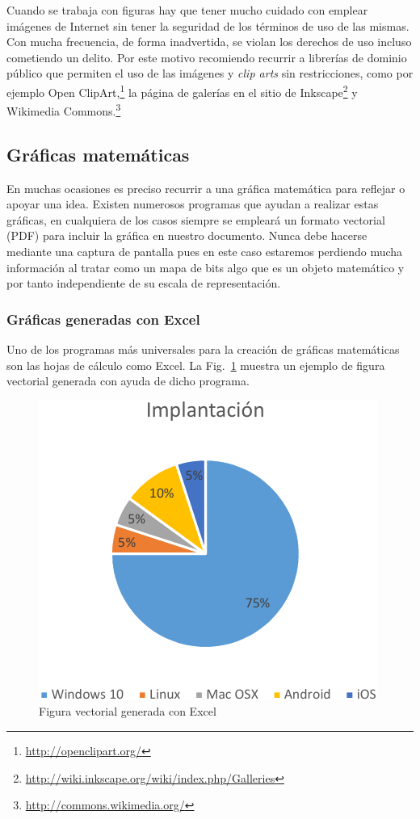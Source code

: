 \documentclass[11pt,a4paper]{article}
\begin{document}
Cuando se trabaja con figuras hay que tener mucho cuidado con emplear imágenes de Internet sin tener la seguridad de los términos de uso de las mismas. Con mucha frecuencia, de forma inadvertida, se violan los derechos de uso incluso cometiendo un delito. Por este motivo recomiendo recurrir a librerías de dominio público que permiten el uso de las imágenes y \emph{clip arts} sin restricciones, como por ejemplo Open ClipArt,\footnote{\url{http://openclipart.org/}} la página de galerías en el sitio de Inkscape\footnote{\url{http://wiki.inkscape.org/wiki/index.php/Galleries}} y Wikimedia Commons.\footnote{\url{http://commons.wikimedia.org/}}



\newpage
\subsection{Gráficas matemáticas}
En muchas ocasiones es preciso recurrir a una gráfica matemática para reflejar o apoyar una idea. Existen numerosos programas que ayudan a realizar estas gráficas, en cualquiera de los casos siempre se empleará un formato vectorial (PDF) para incluir la gráfica en nuestro documento. Nunca debe hacerse mediante una captura de pantalla pues en este caso estaremos perdiendo mucha información al tratar como un mapa de bits algo que es un objeto matemático y por tanto independiente de su escala de representación.

\subsubsection{Gráficas generadas con Excel}
Uno de los programas más universales para la creación de gráficas matemáticas son las hojas de cálculo como Excel. La Fig.~\ref{fig:excel} muestra un ejemplo de figura vectorial generada con ayuda de dicho programa.

\begin{figure}[htb]
	\centering
	\includegraphics[width=0.5\linewidth]{EjFigsExcel} 
	\caption[Gráfico de Excel]{Figura vectorial generada con Excel}
	\label{fig:excel}
\end{figure}
\end{document}
